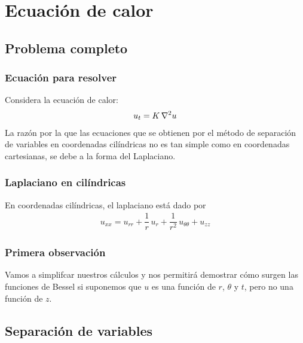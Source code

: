 \documentclass[12pt]{beamer}
\begin{document}
\section{Ecuación de calor}
\subsection{Problema completo}

\begin{frame}
\frametitle{Ecuación para resolver}
Considera la ecuación de calor:
\begin{align*}
u_{t} =  K \,  \laplacian{u}
\end{align*}
La razón por la que las ecuaciones que se obtienen por el método de separación de variables en coordenadas cilíndricas no es tan simple como en coordenadas cartesianas, se debe a la forma del Laplaciano. 
\end{frame}
\begin{frame}
\frametitle{Laplaciano en cilíndricas}
En coordenadas cilíndricas, el laplaciano está dado por
\begin{align*}
u_{xx} = u_{rr} + \dfrac{1}{r} \, u_{r} + \dfrac{1}{r^{2}} \, u_{\theta \theta} + u_{zz}
\end{align*}
\end{frame}
\begin{frame}
\frametitle{Primera observación}
Vamos a simplifcar nuestros cálculos y nos permitirá demostrar cómo surgen las funciones de Bessel si suponemos que $u$ es una función de $r$, $\theta$ y $t$, pero no una función de $z$.
\end{frame}

\subsection{Separación de variables}
\end{document}
